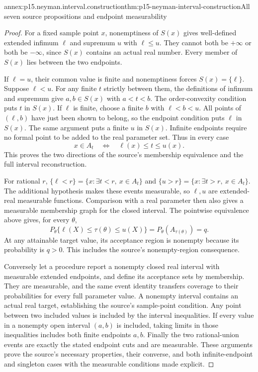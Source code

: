 \begin{annexitem}{annex:p15.neyman.interval.construction}{thm:p15-neyman-interval-construction}{All seven source propositions and endpoint measurability}
\begin{proof}
For a fixed sample point \(x\),
nonemptiness of \(S(x)\) gives
well-defined extended infimum
\(\ell\) and supremum \(u\)
with \(\ell\leq u\).
They cannot both be \(+\infty\)
or both be \(-\infty\), since
\(S(x)\) contains an actual real
number. Every member of \(S(x)\)
lies between the two endpoints.

If \(\ell=u\), their common
value is finite and nonemptiness
forces \(S(x)=\{\ell\}\).
Suppose \(\ell<u\).
For any finite \(t\) strictly
between them, the definitions
of infimum and supremum give
\(a,b\in S(x)\) with \(a<t<b\).
The order-convexity condition
puts \(t\) in \(S(x)\).
If \(\ell\) is finite, choose
a finite \(b\) with \(\ell<b<u\).
All points of \((\ell,b)\)
have just been shown to belong,
so the endpoint condition
puts \(\ell\) in \(S(x)\).
The same argument puts a finite
\(u\) in \(S(x)\).
Infinite endpoints require no
formal point to be added to
the real parameter set.
Thus in every case
\[
                          x\in A_t
                 \quad\Longleftrightarrow\quad
                          \ell(x)\leq t\leq u(x).
\]
This proves the two directions
of the source's membership
equivalence and the full
interval reconstruction.

For rational \(r\),
\(\{\ell<r\}=\{x:\exists t<r,\ x\in A_t\}\)
and
\(\{u>r\}=\{x:\exists t>r,\ x\in A_t\}\).
The additional hypothesis makes
these events measurable, so
\(\ell,u\) are extended-real
measurable functions. Comparison
with a real parameter then also
gives a measurable membership
graph for the closed interval.
The pointwise equivalence above
gives, for every \(\theta\),
\[
 P_\theta\{\ell(X)\leq\tau(\theta)\leq u(X)\}
                            =P_\theta(A_{\tau(\theta)})=q.
\]
At any attainable target value,
its acceptance region is nonempty
because its probability is \(q>0\).
This includes the source's
nonempty-region consequence.

Conversely let a procedure report
a nonempty closed real interval
with measurable extended endpoints,
and define its acceptance sets
by membership. They are measurable,
and the same event identity
transfers coverage to their
probabilities for every full
parameter value. A nonempty
interval contains an actual
real target, establishing the
source's sample-point condition.
Any point between two included
values is included by the
interval inequalities.
If every value in a nonempty
open interval \((a,b)\) is
included, taking limits in
those inequalities includes
both finite endpoints \(a,b\).
Finally the two rational-union
events are exactly the stated
endpoint cuts and are measurable.
These arguments prove the
source's necessary properties,
their converse, and both
infinite-endpoint and singleton
cases with the measurable
conditions made explicit.
\end{proof}
\end{annexitem}

